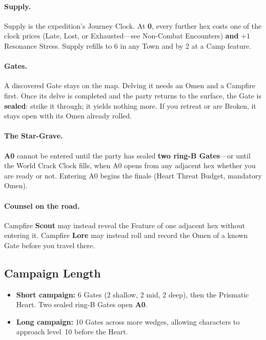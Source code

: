 \paragraph{Supply.}
Supply is the expedition's Journey Clock. At \textbf{0}, every further hex costs one of the clock prices (Late, Lost, or Exhausted---see Non-Combat Encounters) \textbf{and} $+1$ Resonance Stress. Supply refills to 6 in any Town and by 2 at a Camp feature.

\paragraph{Gates.}
A discovered Gate stays on the map. Delving it needs an Omen and a Campfire first. Once its delve is completed and the party returns to the surface, the Gate is \textbf{sealed}: strike it through; it yields nothing more. If you retreat or are Broken, it stays open with its Omen already rolled.

\paragraph{The Star-Grave.}
\textbf{A0} cannot be entered until the party has sealed \textbf{two ring-B Gates}---or until the World Crack Clock fills, when A0 opens from any adjacent hex whether you are ready or not. Entering A0 begins the finale (Heart Threat Budget, mandatory Omen).

\paragraph{Counsel on the road.}
Campfire \textbf{Scout} may instead reveal the Feature of one adjacent hex without entering it. Campfire \textbf{Lore} may instead roll and record the Omen of a known Gate before you travel there.

\subsection{Campaign Length}

\begin{itemize}
    \item \textbf{Short campaign:} 6 Gates (2 shallow, 2 mid, 2 deep), then the Prismatic Heart. Two sealed ring-B Gates open \textbf{A0}.
    \item \textbf{Long campaign:} 10 Gates across more wedges, allowing characters to approach level~10 before the Heart.
\end{itemize}

